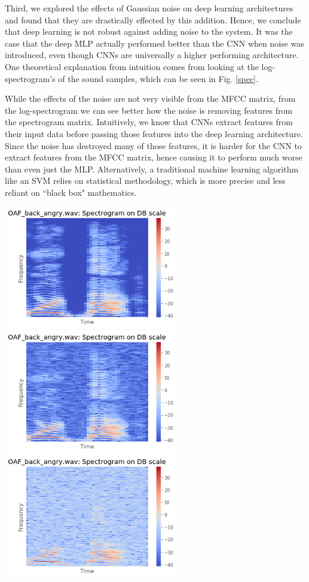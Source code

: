 \documentclass[12pt]{article}
\begin{document}
\begin{multicols*}{2}
Third, we explored the effects of Gaussian noise on deep learning architectures and found that they are drastically effected by this addition. Hence, we conclude that deep learning is not robust against adding noise to the system. It was the case that the deep MLP actually performed better than the CNN when noise was introduced, even though CNNs are universally a higher performing architecture. One theoretical explanation from intuition comes from looking at the log-spectrogram's of the sound samples, which can be seen in Fig. \ref{spec}.


While the effects of the noise are not very visible from the MFCC matrix, from the log-spectrogram we can see better how the noise is removing features from the spectrogram matrix. Intuitively, we know that CNNs extract features from their input data before passing those features into the deep learning architecture. Since the noise has destroyed many of those features, it is harder for the CNN to extract features from the MFCC matrix, hence causing it to perform much worse than even just the MLP. Alternatively, a traditional machine learning algorithm like an SVM relies on statistical methodology, which is more precise and less reliant on ``black box" mathematics.

{
    \centering
    \includegraphics[width=3in]{figures/spec-no.png}
    \includegraphics[width=3in]{figures/spec-light.png}
    \includegraphics[width=3in]{figures/spec-heavy.png}
    \label{spec}
}


\end{multicols*}
\end{document}
